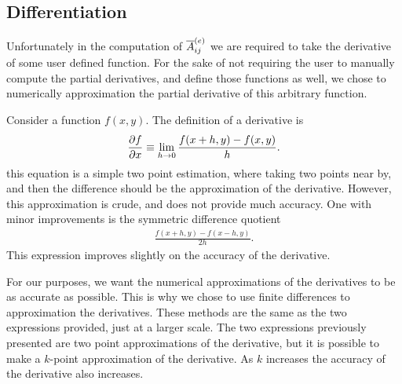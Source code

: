 \documentclass[../fem.tex]{subfile}
\begin{document}
\subsection{Differentiation}%
\label{sub:differentiation}

Unfortunately in the computation of $\overline{A}^{(e)}_{ij}$ we are required to take the
derivative of some user defined function. For the sake of not requiring the
user to manually compute the partial derivatives, and define those functions as
well, we chose to numerically approximation the partial derivative of this
arbitrary function.

Consider a function $f(x,y)$. The definition of a derivative is
\begin{align*}
  \frac{\partial f}{\partial x}\equiv\lim_{h\rightarrow 0}\frac{f(x+h,y)-f(x,y)}{h}.
\end{align*}
this equation is a simple two point estimation, where taking two points near
by, and then the difference should be the approximation of the derivative.
However, this approximation is crude, and does not provide much accuracy. One
with minor improvements is the symmetric difference quotient
\begin{align*}
  \frac{f(x+h,y)-f(x-h,y)}{2h}.
\end{align*}
This expression improves slightly on the accuracy of the derivative.

For our purposes, we want the numerical approximations of the derivatives to be
as accurate as possible. This is why we chose to use finite differences to
approximation the derivatives. These methods are the same as the two
expressions provided, just at a larger scale. The two expressions previously
presented are two point approximations of the derivative, but it is possible to
make a $k$-point approximation of the derivative. As $k$ increases the accuracy
of the derivative also increases.
\end{document}
